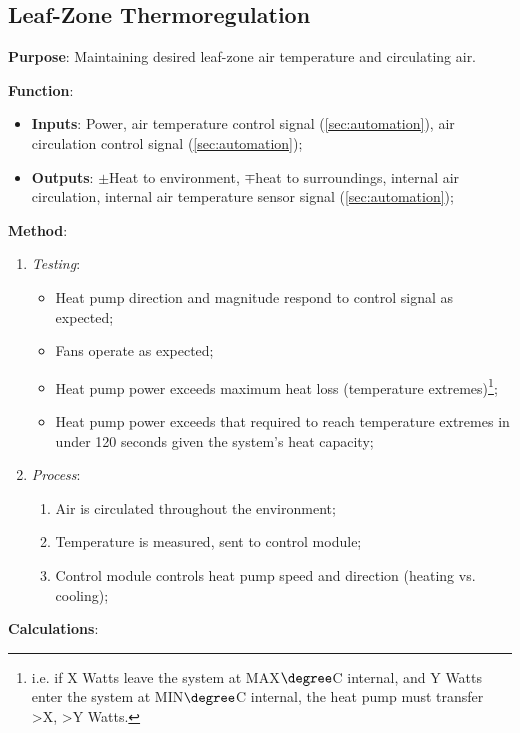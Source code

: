 \subsection{Leaf-Zone Thermoregulation}
\label{sec:airthermoregulation}

\textbf{Purpose}: Maintaining desired leaf-zone air temperature and circulating air.

\textbf{Function}:
\begin{itemize}
    \item \textbf{Inputs}: Power, air temperature control signal (\ref{sec:automation}), air circulation control signal (\ref{sec:automation});
    \item \textbf{Outputs}: $\pm$Heat to environment, $\mp$heat to surroundings, internal air circulation, internal air temperature sensor signal (\ref{sec:automation});
\end{itemize}

\textbf{Method}:
\begin{enumerate}
    \item \textit{Testing}:
    \begin{itemize}
        \item Heat pump direction and magnitude respond to control signal as expected;
        \item Fans operate as expected;
        \item Heat pump power exceeds maximum heat loss (temperature extremes)\footnote{i.e. if X Watts leave the system at MAX$\degree$C internal, and Y Watts enter the system at MIN$\degree$C internal, the heat pump must transfer >X, >Y Watts.};
        \item Heat pump power exceeds that required to reach temperature extremes in under 120 seconds given the system's heat capacity;
    \end{itemize}
    \item \textit{Process}:
    \begin{enumerate}
        \item Air is circulated throughout the environment;
        \item Temperature is measured, sent to control module;
        \item Control module controls heat pump speed and direction (heating vs. cooling);
    \end{enumerate}
\end{enumerate}

\textbf{Calculations}:

